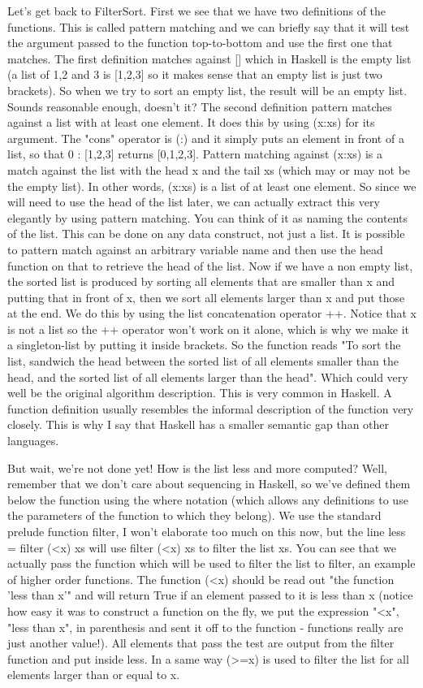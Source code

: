 \documentclass{report}
\begin{document}
Let's get back to FilterSort. First we see that we have two definitions of the functions. This is called pattern matching and we can briefly say that it will test the argument passed to the function top-to-bottom and use the first one that matches. The first definition matches against [] which in Haskell is the empty list (a list of 1,2 and 3 is [1,2,3] so it makes sense that an empty list is just two brackets). So when we try to sort an empty list, the result will be an empty list. Sounds reasonable enough, doesn't it? The second definition pattern matches against a list with at least one element. It does this by using (x:xs) for its argument. The "cons" operator is (:) and it simply puts an element in front of a list, so that 0 : [1,2,3] returns [0,1,2,3]. Pattern matching against (x:xs) is a match against the list with the head x and the tail xs (which may or may not be the empty list). In other words, (x:xs) is a list of at least one element. So since we will need to use the head of the list later, we can actually extract this very elegantly by using pattern matching. You can think of it as naming the contents of the list. This can be done on any data construct, not just a list. It is possible to pattern match against an arbitrary variable name and then use the head function on that to retrieve the head of the list. Now if we have a non empty list, the sorted list is produced by sorting all elements that are smaller than x and putting that in front of x, then we sort all elements larger than x and put those at the end. We do this by using the list concatenation operator ++. Notice that x is not a list so the ++ operator won't work on it alone, which is why we make it a singleton-list by putting it inside brackets. So the function reads "To sort the list, sandwich the head between the sorted list of all elements smaller than the head, and the sorted list of all elements larger than the head". Which could very well be the original algorithm description. This is very common in Haskell. A function definition usually resembles the informal description of the function very closely. This is why I say that Haskell has a smaller semantic gap than other languages.

But wait, we're not done yet! How is the list less and more computed? Well, remember that we don't care about sequencing in Haskell, so we've defined them below the function using the where notation (which allows any definitions to use the parameters of the function to which they belong). We use the standard prelude function filter, I won't elaborate too much on this now, but the line less = filter (<x) xs will use filter (<x) xs to filter the list xs. You can see that we actually pass the function which will be used to filter the list to filter, an example of higher order functions. The function (<x) should be read out "the function 'less than x'" and will return True if an element passed to it is less than x (notice how easy it was to construct a function on the fly, we put the expression "<x", "less than x", in parenthesis and sent it off to the function - functions really are just another value!). All elements that pass the test are output from the filter function and put inside less. In a same way (>=x) is used to filter the list for all elements larger than or equal to x.
\end{document}
